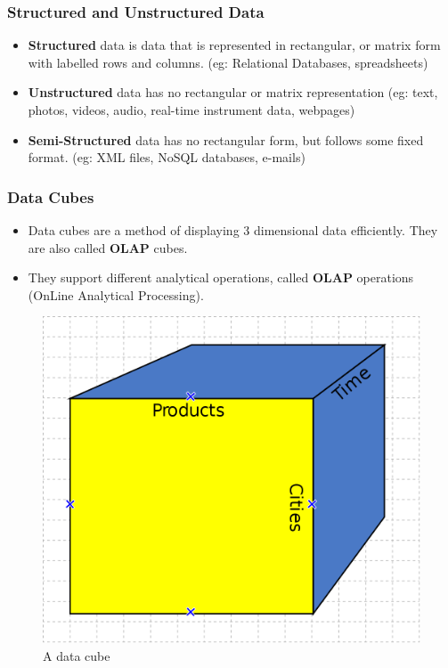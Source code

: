 \documentclass{article}
\theoremstyle{plain}
\theoremstyle{definition}
\begin{document}
\subsubsection{Structured and Unstructured Data}
\begin{itemize}
    \item \textbf{Structured} data is data that is represented in rectangular, or matrix form with labelled rows and columns. (eg: Relational Databases, spreadsheets)
    
    \item \textbf{Unstructured} data has no rectangular or matrix representation (eg: text, photos, videos, audio, real-time instrument data, webpages)
    
    \item \textbf{Semi-Structured} data has no rectangular form, but follows some fixed format.
    (eg: XML files, NoSQL databases, e-mails)
\end{itemize}

\subsubsection{Data Cubes}
\begin{itemize}
    \item Data cubes are a method of displaying 3 dimensional data efficiently. They are also called \textbf{OLAP} cubes.
    
    \item They support different analytical operations, called \textbf{OLAP} operations (OnLine Analytical Processing). 
    
\end{itemize}
\begin{figure}[h]
    \centering
    \includegraphics[scale=0.2]{da1.png}
    \caption{A data cube}
    \label{fig:my_label}
\end{figure}
\end{document}
